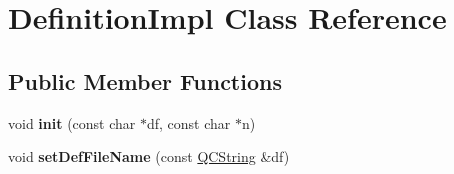 \hypertarget{class_definition_impl}{}\section{Definition\+Impl Class Reference}
\label{class_definition_impl}
\subsection*{Public Member Functions}
\begin{DoxyCompactItemize}
\item 
\mbox{\label{class_definition_impl_a85ef125ece3adbf81088aed11b23a695}} 
void {\bfseries init} (const char $\ast$df, const char $\ast$n)
\item 
\mbox{\label{class_definition_impl_ac356ba5838a2753c10e310acd0f5f37f}} 
void {\bfseries set\+Def\+File\+Name} (const \mbox{\hyperlink{class_q_c_string}{Q\+C\+String}} \&df)
\end{DoxyCompactItemize}
